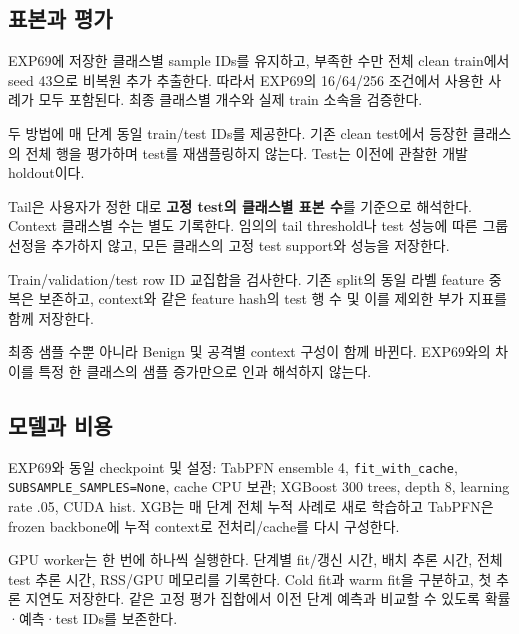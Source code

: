 \subsection{표본과 평가}
\par\noindent \textbullet\enspace EXP69에 저장한 클래스별 sample IDs를 유지하고, 부족한 수만 전체 clean train에서 seed 43으로 비복원 추가 추출한다. 따라서 EXP69의 16/\allowbreak{}64/\allowbreak{}256 조건에서 사용한 사례가 모두 포함된다. 최종 클래스별 개수와 실제 train 소속을 검증한다.


\par\noindent \textbullet\enspace 두 방법에 매 단계 동일 train/\allowbreak{}test IDs를 제공한다. 기존 clean test에서 등장한 클래스의 전체 행을 평가하며 test를 재샘플링하지 않는다. Test는 이전에 관찰한 개발 holdout이다.


\par\noindent \textbullet\enspace Tail은 사용자가 정한 대로 \textbf{고정 test의 클래스별 표본 수}를 기준으로 해석한다. Context 클래스별 수는 별도 기록한다. 임의의 tail threshold나 test 성능에 따른 그룹 선정을 추가하지 않고, 모든 클래스의 고정 test support와 성능을 저장한다.


\par\noindent \textbullet\enspace Train/\allowbreak{}validation/\allowbreak{}test row ID 교집합을 검사한다. 기존 split의 동일 라벨 feature 중복은 보존하고, context와 같은 feature hash의 test 행 수 및 이를 제외한 부가 지표를 함께 저장한다.


\par\noindent \textbullet\enspace 최종 샘플 수뿐 아니라 Benign 및 공격별 context 구성이 함께 바뀐다. EXP69와의 차이를 특정 한 클래스의 샘플 증가만으로 인과 해석하지 않는다.


\subsection{모델과 비용}
EXP69와 동일 checkpoint 및 설정: TabPFN ensemble 4, \texttt{fit\_\allowbreak{}\allowbreak{}with\allowbreak{}\_\allowbreak{}\allowbreak{}cache}, \texttt{SUBSAMPL\allowbreak{}E\_\allowbreak{}\allowbreak{}SAMPLE\allowbreak{}S=\allowbreak{}\allowbreak{}None}, cache CPU 보관; XGBoost 300 trees, depth 8, learning rate .05, CUDA hist. XGB는 매 단계 전체 누적 사례로 새로 학습하고 TabPFN은 frozen backbone에 누적 context로 전처리/\allowbreak{}cache를 다시 구성한다.

GPU worker는 한 번에 하나씩 실행한다. 단계별 fit/\allowbreak{}갱신 시간, 배치 추론 시간, 전체 test 추론 시간, RSS/\allowbreak{}GPU 메모리를 기록한다. Cold fit과 warm fit을 구분하고, 첫 추론 지연도 저장한다. 같은 고정 평가 집합에서 이전 단계 예측과 비교할 수 있도록 확률·예측·test IDs를 보존한다.

